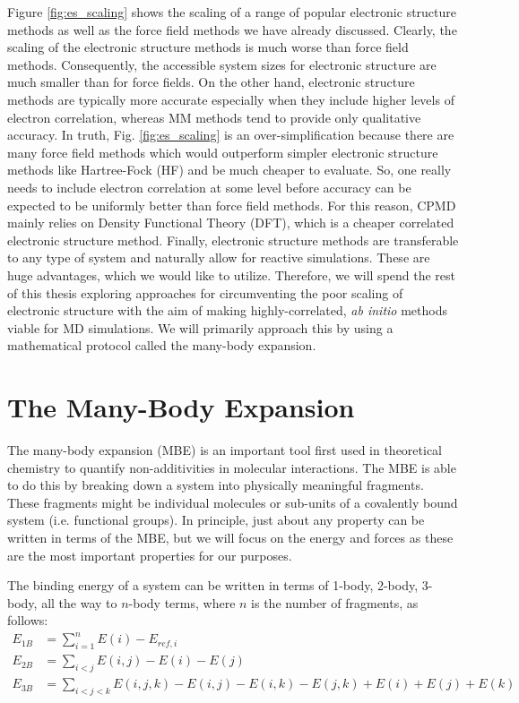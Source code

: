 \documentclass[11pt, proquest]{uwthesis}[2020/02/24]
\begin{document}
Figure \ref{fig:es_scaling} shows the scaling of a range of popular electronic structure methods as well as the force field methods we have already discussed. Clearly, the scaling of the electronic structure methods is much worse than force field methods. Consequently, the accessible system sizes for electronic structure are much smaller than for force fields. On the other hand, electronic structure methods are typically more accurate especially when they include higher levels of electron correlation, whereas MM methods tend to provide only qualitative accuracy. In truth, Fig. \ref{fig:es_scaling} is an over-simplification because there are many force field methods which would outperform simpler electronic structure methods like Hartree-Fock (HF) and be much cheaper to evaluate. So, one really needs to include electron correlation at some level before accuracy can be expected to be uniformly better than force field methods. For this reason, CPMD mainly relies on Density Functional Theory (DFT), which is a cheaper correlated electronic structure method. Finally, electronic structure methods are transferable to any type of system and naturally allow for reactive simulations. These are huge advantages, which we would like to utilize. Therefore, we will spend the rest of this thesis exploring approaches for circumventing the poor scaling of electronic structure with the aim of making highly-correlated, \textit{ab initio} methods viable for MD simulations. We will primarily approach this by using a mathematical protocol called the many-body expansion.

\chapter{The Many-Body Expansion}

\par The many-body expansion (MBE) is an important tool first used in theoretical chemistry to quantify non-additivities in molecular interactions.\autocite{hankins_hydrogen-bond_1970} The MBE is able to do this by breaking down a system into physically meaningful fragments. These fragments might be individual molecules or sub-units of a covalently bound system (i.e. functional groups). In principle, just about any property can be written in terms of the MBE, but we will focus on the energy and forces as these are the most important properties for our purposes.

\par The binding energy of a system can be written in terms of 1-body, 2-body, 3-body, all the way to $n$-body terms, where $n$ is the number of fragments, as follows:
\begin{align}
    E_{1B} &= \sum_{i=1}^nE(i)-E_{ref,i} \\
    E_{2B} &= \sum_{i<j}E(i,j)-E(i)-E(j) \\
    E_{3B} &= \sum_{i<j<k} E(i,j,k)-E(i,j)-E(i,k)-E(j,k)+E(i)+E(j)+E(k)
\end{align}
\end{document}

